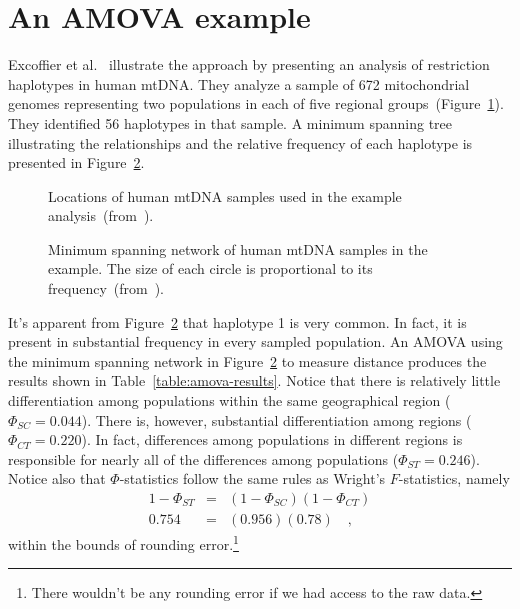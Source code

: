 \section*{An AMOVA example}

Excoffier et al.~\cite{Excoffier-etal92} illustrate the approach by
presenting an analysis of restriction haplotypes in human mtDNA. They
analyze a sample of 672 mitochondrial genomes representing two
populations in each of five regional
groups~(Figure~\ref{fig:amova-sample-locations}). They identified 56
haplotypes in that sample. A minimum spanning tree illustrating the
relationships and the relative frequency of each haplotype is
presented in Figure~\ref{fig:amova-haplotypes}.

\begin{figure}
\begin{center}
\end{center}
\caption{Locations of human mtDNA samples used in the example
  analysis~(from~\cite{Excoffier-etal92}).}\label{fig:amova-sample-locations}
\end{figure}

\begin{figure}
\begin{center}
\end{center}
\caption{Minimum spanning network of human mtDNA samples in the
  example. The size of each circle is proportional to its
  frequency~(from~\cite{Excoffier-etal92}).}\label{fig:amova-haplotypes}
\end{figure}

It's apparent from Figure~\ref{fig:amova-haplotypes} that haplotype 1
is very common. In fact, it is present in substantial frequency in
every sampled population. An AMOVA using the minimum spanning network
in Figure~\ref{fig:amova-haplotypes} to measure distance produces the
results shown in Table~\ref{table:amova-results}. Notice that there is
relatively little differentiation among populations within the same
geographical region ($\Phi_{SC} = 0.044$). There is, however,
substantial differentiation among regions ($\Phi_{CT} = 0.220$). In
fact, differences among populations in different regions is
responsible for nearly all of the differences among populations
($\Phi_{ST} = 0.246$). Notice also that $\Phi$-statistics follow the
same rules as Wright's $F$-statistics, namely
\begin{eqnarray*}
1 - \Phi_{ST} &=& (1 - \Phi_{SC})(1 - \Phi_{CT}) \\
0.754 &=& (0.956)(0.78) \quad ,
\end{eqnarray*}
within the bounds of rounding error.\footnote{There wouldn't be any
  rounding error if we had access to the raw data.}

